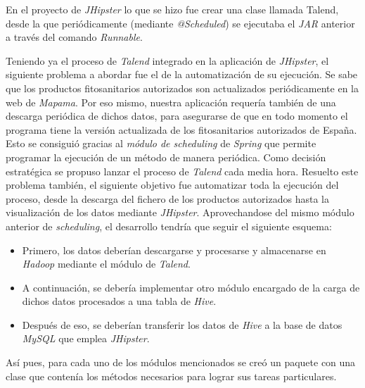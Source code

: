 En el proyecto de \textit{JHipster} lo que se hizo fue crear una clase llamada Talend, desde la que periódicamente (mediante \textit{@Scheduled}) se ejecutaba el \textit{JAR} anterior a través del comando \textit{Runnable}. 

\par
Teniendo ya el proceso de \textit{Talend} integrado en la aplicación de \textit{JHipster}, el siguiente problema a abordar fue el de la automatización de su ejecución. Se sabe que los productos fitosanitarios autorizados son actualizados periódicamente en la web de \textit{Mapama}. Por eso mismo, nuestra aplicación requería también de una descarga periódica de dichos datos, para asegurarse de que en todo momento el programa tiene la versión actualizada de los fitosanitarios autorizados de España. Esto se consiguió gracias al \textit{módulo de scheduling}\cite{spring_scheduling} de \textit{Spring} que permite programar la ejecución de un método de manera periódica. Como decisión estratégica se propuso lanzar el proceso de \textit{Talend} cada media hora. Resuelto este problema también, el siguiente objetivo fue automatizar toda la ejecución del proceso, desde la descarga del fichero de los productos autorizados hasta la visualización de los datos mediante \textit{JHipster}. Aprovechandose del mismo módulo anterior de \textit{scheduling}, el desarrollo tendría que seguir el siguiente esquema: 
\begin{itemize}
\item Primero, los datos deberían descargarse y procesarse y almacenarse en \textit{Hadoop} mediante el módulo de \textit{Talend}.
\item A continuación, se debería implementar otro módulo encargado de la carga de dichos datos procesados a una tabla de \textit{Hive}.
\item Después de eso, se deberían transferir los datos de \textit{Hive} a la base de datos \textit{MySQL} que emplea \textit{JHipster}.
\end{itemize}
  \par Así pues, para cada uno de los módulos mencionados se creó un paquete con una clase que contenía los métodos necesarios para lograr sus tareas particulares.


